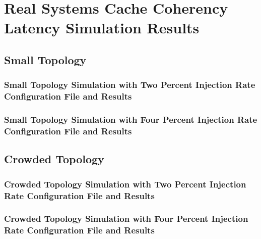 \chapter{Real Systems Cache Coherency Latency Simulation Results}
\section{Small Topology}
\subsection{Small Topology Simulation with Two Percent Injection Rate Configuration File and Results}

\subsection{Small Topology Simulation with Four Percent Injection Rate Configuration File and Results}


\section{Crowded Topology}
\subsection{Crowded Topology Simulation with Two Percent Injection Rate  Configuration File and Results}

\subsection{Crowded Topology Simulation with Four Percent Injection Rate  Configuration File and Results}

